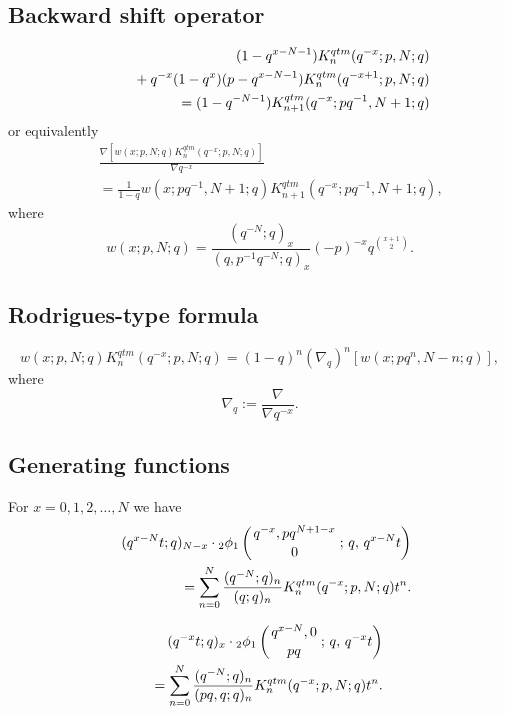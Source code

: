 \documentclass[envcountchap,graybox]{svmono}
\newcommand{\qhyp}[5]{\mbox{}_{#1}{\phi}_{#2}
\left(\genfrac{}{}{0pt}{}{#3}{#4}\,;\,q,\,#5\right)}
\newcommand{\mathindent}{\hspace{7.5mm}}
\begin{document}
\subsection*{Backward shift operator}
\begin{eqnarray}
\label{shift2QuantumqKrawtchoukI}
& &(1-q^{x-N-1})K_n^{qtm}(q^{-x};p,N;q)\nonumber\\
& &{}\mathindent{}+q^{-x}(1-q^x)(p-q^{x-N-1})K_n^{qtm}(q^{-x+1};p,N;q)\nonumber\\
& &{}=(1-q^{-N-1})K_{n+1}^{qtm}(q^{-x};pq^{-1},N+1;q)
\end{eqnarray}
or equivalently
\begin{eqnarray}
\label{shift2QuantumqKrawtchoukII}
& &\frac{\nabla\left[w(x;p,N;q)K_n^{qtm}(q^{-x};p,N;q)\right]}{\nabla q^{-x}}\nonumber\\
& &{}=\frac{1}{1-q}w(x;pq^{-1},N+1;q)K_{n+1}^{qtm}(q^{-x};pq^{-1},N+1;q),
\end{eqnarray}
where
$$w(x;p,N;q)=\frac{(q^{-N};q)_x}{(q,p^{-1}q^{-N};q)_x}(-p)^{-x}q^{\binom{x+1}{2}}.$$

\subsection*{Rodrigues-type formula}
\begin{equation}
\label{RodQuantumqKrawtchouk}
w(x;p,N;q)K_n^{qtm}(q^{-x};p,N;q)=(1-q)^n\left(\nabla_q\right)^n\left[w(x;pq^n,N-n;q)\right],
\end{equation}
where
$$\nabla_q:=\frac{\nabla}{\nabla q^{-x}}.$$

\subsection*{Generating functions} For $x=0,1,2,\ldots,N$ we have
\begin{eqnarray}
\label{GenQuantumqKrawtchouk1}
& &(q^{x-N}t;q)_{N-x}\cdot\qhyp{2}{1}{q^{-x},pq^{N+1-x}}{0}{q^{x-N}t}\nonumber\\
& &{}=\sum_{n=0}^N\frac{(q^{-N};q)_n}{(q;q)_n}K_n^{qtm}(q^{-x};p,N;q)t^n.
\end{eqnarray}

\begin{eqnarray}
\label{GenQuantumqKrawtchouk2}
& &(q^{-x}t;q)_x\cdot\qhyp{2}{1}{q^{x-N},0}{pq}{q^{-x}t}\nonumber\\
& &{}=\sum_{n=0}^N\frac{(q^{-N};q)_n}{(pq,q;q)_n}K_n^{qtm}(q^{-x};p,N;q)t^n.
\end{eqnarray}
\end{document}
